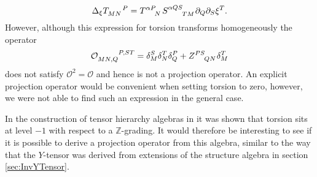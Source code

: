 \begin{equation}
\Delta_\xi \tensor{T}{_{MN}^P} = \tensor{T}{^{\alpha P}_N}\tensor{S}{^{\alpha QS}_{TM}}\pd_Q\pd_S\xi^T.
\end{equation}
However, although this expression for torsion transforms homogeneously the operator 
\begin{equation}
    \tensor{\mathcal{O}}{_{MN,Q}^{P,ST}} = \delta^S_M\delta^T_N\delta_Q^P+\tensor{Z}{^{PS}_{QN}}\delta^T_M
\end{equation}
does not satisfy $\mathcal{O}^2=\mathcal{O}$ and hence is not a projection operator. An explicit projection operator would be convenient when setting torsion to zero, however, we were not able to find such an expression in the general case. 

In the construction of tensor hierarchy algebras in \cite{Carbone:2018njd} it was shown that torsion sits at level $-1$ with respect to a $\mathbb{Z}$-grading. It would therefore be interesting to see if it is possible to derive a projection operator from this algebra, similar to the way that the $Y$-tensor was derived from extensions of the structure algebra in section \ref{sec:InvYTensor}. 

